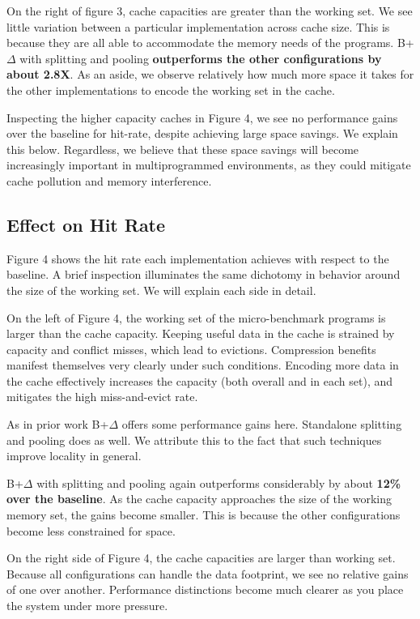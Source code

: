 \documentclass[pageno]{jpaper}
\begin{document}
On the right of figure 3, cache capacities are greater than the working set. We see little variation between a particular implementation across cache size. This is because they are all able to accommodate the memory needs of the programs. B+$\Delta$ with splitting and pooling \textbf{outperforms the other configurations by about 2.8X}. As an aside, we observe relatively how much more space it takes for the other implementations to encode the working set in the cache.

Inspecting the higher capacity caches in Figure 4, we see no performance gains over the baseline for hit-rate, despite achieving large space savings. We explain this below. Regardless, we believe that these space savings will become increasingly important in multiprogrammed environments, as they could mitigate cache pollution and memory interference.

\subsection{Effect on Hit Rate}

Figure 4 shows the hit rate each implementation achieves with respect to the baseline. A brief inspection illuminates the same dichotomy in behavior around the size of the working set. We will explain each side in detail. 

On the left of Figure 4, the working set of the micro-benchmark programs is larger than the cache capacity. Keeping useful data in the cache is strained by capacity and conflict misses, which lead to evictions. Compression benefits manifest themselves very clearly under such conditions. Encoding more data in the cache effectively increases the capacity (both overall and in each set), and mitigates the high miss-and-evict rate.

As in prior work B+$\Delta$ offers some performance gains here. Standalone splitting and pooling does as well. We attribute this to the fact that such techniques improve locality in general.

B+$\Delta$ with splitting and pooling again outperforms considerably by about \textbf{12\% over the baseline}. As the cache capacity approaches the size of the working memory set, the gains become smaller. This is because the other configurations become less constrained for space.

On the right side of Figure 4, the cache capacities are larger than working set. Because all configurations can handle the data footprint, we see no relative gains of one over another. Performance distinctions become much clearer as you place the system under more pressure.
\end{document}
